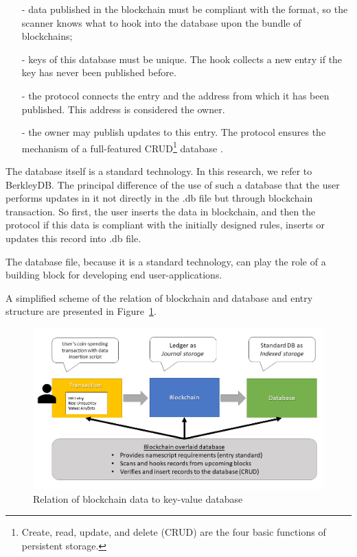\begin{multicols}{2}
\begin{itemize}
\item [-]data published in the blockchain must be compliant with the format, so the scanner knows what to hook into the database upon the bundle of blockchains;
\item [-] keys of this database must be unique. The hook collects a new entry if the key has never been published before.
\item [-] the protocol connects the entry and the address from which it has been published. This address is considered the owner.
\item [-] the owner may publish updates to this entry. The protocol ensures the mechanism of a full-featured CRUD\footnote{Create, read, update, and delete (CRUD) are the four basic functions of persistent storage.} database \cite{art1-key27}.
\end{itemize}

The database itself is a standard technology. In this research, we refer to BerkleyDB. The principal difference of the use of such a database that the user performs updates in it not directly in the .db file but through blockchain transaction. So first, the user inserts the data in blockchain, and then the protocol if this data is compliant with the initially designed rules, inserts or updates this record into .db file.

The database file, because it is a standard technology, can play the role of a building block for developing end user-applications.

A simplified scheme of the relation of blockchain and database and entry structure are presented in Figure~\ref{chap1-fig02}.

\begin{figure}[H]
\centering
\includegraphics[scale=1.06]{src/Figures/chap1/chap1-fig02.jpg}
\caption{Relation of blockchain data to key-value database}\label{chap1-fig02}
\end{figure}


\end{multicols}
